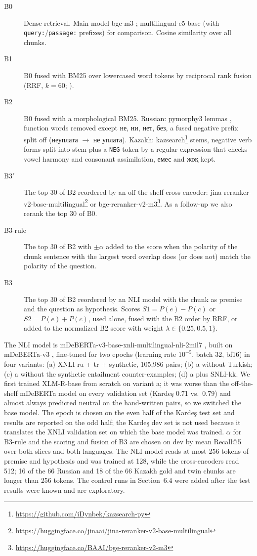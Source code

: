 \documentclass[11pt]{article}
\newcommand{\ru}[1]{#1}
\begin{document}
\begin{description}
\item[B0] Dense retrieval. Main model bge-m3 \citep{chen2024m3}; multilingual-e5-base \citep{wang2024multilingual}
(with \texttt{query:}/\texttt{passage:} prefixes) for comparison. Cosine similarity over all chunks.
\item[B1] B0 fused with BM25 \citep{robertson2009prf} over lowercased word tokens by reciprocal rank fusion
(RRF, $k=60$; \citealp{cormack2009rrf}).
\item[B2] B0 fused with a morphological BM25. Russian: pymorphy3 lemmas \citep{korobov2015pymorphy2}, function words removed except
\ru{не, ни, нет, без}, a fused negative prefix split off (\ru{неуплата} $\rightarrow$ \ru{не уплата}).
Kazakh: kazsearch\footnote{\url{https://github.com/iDynbek/kazsearch-py}} stems, negative verb forms split into stem plus a \texttt{NEG} token by a regular
expression that checks vowel harmony and consonant assimilation, \ru{емес} and \ru{жоқ} kept.
\item[B3$'$] The top 30 of B2 reordered by an off-the-shelf cross-encoder: jina-reranker-v2-base-multilingual\footnote{\url{https://huggingface.co/jinaai/jina-reranker-v2-base-multilingual}}
or bge-reranker-v2-m3\footnote{\url{https://huggingface.co/BAAI/bge-reranker-v2-m3}}. As a follow-up we also rerank the top 30 of B0.
\item[B3-rule] The top 30 of B2 with $\pm\alpha$ added to the score when the polarity of the chunk sentence
with the largest word overlap does (or does not) match the polarity of the question.
\item[B3] The top 30 of B2 reordered by an NLI model with the chunk as premise and the question as hypothesis.
Scores $S1 = P(e) - P(c)$ or $S2 = P(e) + P(c)$, used alone, fused with the B2 order by RRF, or added to the
normalized B2 score with weight $\lambda \in \{0.25, 0.5, 1\}$.
\end{description}

The NLI model is mDeBERTa-v3-base-xnli-multilingual-nli-2mil7 \citep{laurer2022less}, built on mDeBERTa-v3
\citep{he2023debertav3}, fine-tuned for two epochs (learning rate
$10^{-5}$, batch 32, bf16) in four variants: (a) XNLI ru + tr + synthetic, 105,986 pairs; (b) a without
Turkish; (c) a without the synthetic entailment counter-examples; (d) a plus SNLI-kk. We first trained
XLM-R-base from scratch on variant a; it was worse than the off-the-shelf mDeBERTa model on every validation
set (Karde\c{s} 0.71 vs.\ 0.79) and almost always predicted neutral on the hand-written pairs, so we switched
the base model. The epoch is chosen on the even half of the Karde\c{s} test set and results are reported on the
odd half; the Karde\c{s} dev set is not used because it translates the XNLI validation set on which the base
model was trained. $\alpha$ for B3-rule and the scoring and fusion of B3 are chosen on dev by mean Recall@5
over both slices and both languages. The NLI model reads at most 256 tokens of premise and hypothesis and was
trained at 128, while the cross-encoders read 512; 16 of the 66 Russian and 18 of the 66 Kazakh gold and twin
chunks are longer than 256 tokens. The control runs in Section~6.4 were added after the test results were
known and are exploratory.
\end{document}
